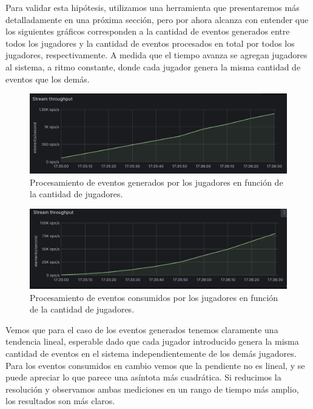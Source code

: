 Para validar esta hipótesis, utilizamos una herramienta que presentaremos más detalladamente en una próxima sección, pero por ahora alcanza con entender que los siguientes gráficos corresponden a la cantidad de eventos generados entre todos los jugadores
y la cantidad de eventos procesados en total por todos los jugadores, respectivamente. A medida que el tiempo avanza se agregan jugadores al sistema, a ritmo constante, donde cada jugador genera la misma cantidad de eventos que los demás.

\begin{figure}[htbp]
    \centering
    \includegraphics[width=1\textwidth]{../assets/stream-producer-metrics.png}
    \caption{Procesamiento de eventos generados por los jugadores en función de la cantidad de jugadores.}
\end{figure}

\newpage

\begin{figure}[htbp]
    \centering
    \includegraphics[width=1\textwidth]{../assets/stream-consumer-metrics.png}
    \caption{Procesamiento de eventos consumidos por los jugadores en función de la cantidad de jugadores.}
\end{figure}

Vemos que para el caso de los eventos generados tenemos claramente una tendencia lineal, esperable dado que cada jugador introducido genera la misma cantidad de eventos en el sistema independientemente de los demás jugadores.
Para los eventos consumidos en cambio vemos que la pendiente no es lineal, y se puede apreciar lo que parece una asíntota más cuadrática. Si reducimos la resolución y observamos ambas mediciones en un rango de tiempo más amplio,
los resultados son más claros.

